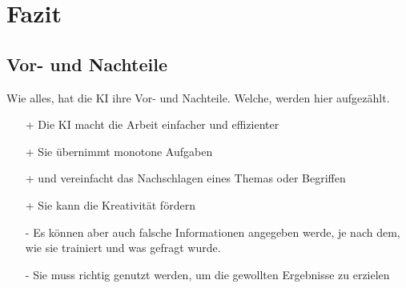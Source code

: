 \chapter{Fazit}
\label{chap:fazit}

\section{Vor- und Nachteile}
Wie alles, hat die KI ihre Vor- und Nachteile. Welche, werden hier aufgezählt.

\begin{itemize}
    \item[+] Die KI macht die Arbeit einfacher und effizienter
    \item[+] Sie übernimmt monotone Aufgaben
    \item[+] und vereinfacht das Nachschlagen eines Themas oder Begriffen
    \item[+] Sie kann die Kreativität fördern
    \item[]
    \item[-] Es können aber auch falsche Informationen angegeben werde, je nach dem, wie sie trainiert und was gefragt wurde.
    \item[-] Sie muss richtig genutzt werden, um die gewollten Ergebnisse zu erzielen
\end{itemize}

\citep{GitHub}